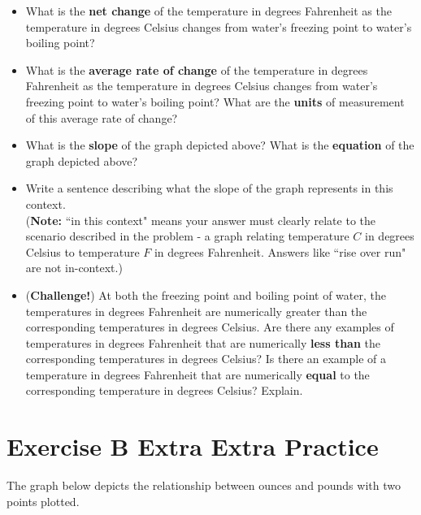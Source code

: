 \documentclass[10pt]{article}
\begin{document}
    \begin{itemize}
    
    \item[(a)] What is the {\bf net change} of the temperature in degrees Fahrenheit as the temperature in degrees Celsius changes from water's freezing point to water's boiling point?
    
    \item[(b)] What is the {\bf average rate of change} of the temperature in degrees Fahrenheit as the temperature in degrees Celsius changes from water's freezing point to water's boiling point? What are the {\bf units} of measurement of this average rate of change?
    
    \item[(c)] What is the {\bf slope} of the graph depicted above? What is the {\bf equation} of the graph depicted above?
    
    \item[(d)] Write a sentence describing what the slope of the graph represents in this context.\\ 
    ({\bf Note:} ``in this context" means your answer must clearly relate to the scenario described in the problem - a graph relating temperature $C$ in degrees Celsius to temperature $F$ in degrees Fahrenheit. Answers like ``rise over run" are not in-context.)

    \item[(e)] ({\bf Challenge!}) At both the freezing point and boiling point of water, the temperatures in degrees Fahrenheit are numerically greater than the corresponding temperatures in degrees Celsius. Are there any examples of temperatures in degrees Fahrenheit that are numerically {\bf less than} the corresponding temperatures in degrees Celsius? Is there an example of a temperature in degrees Fahrenheit that are numerically {\bf equal} to the corresponding temperature in degrees Celsius? Explain.
    
    \end{itemize}




\newpage
\section{Exercise B Extra Extra Practice}



The graph below depicts the relationship between ounces and pounds with two points plotted.
\end{document}
